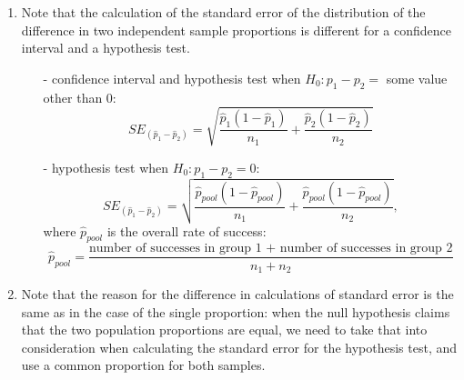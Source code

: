 \documentclass[11pt]{article}
\begin{document}
%
\begin{enumerate}[resume]
\renewcommand\labelenumi{\textcolor{light}{\textbf{LO \theenumi.}}}

\item Note that the calculation of the standard error of the distribution of the difference in two independent sample proportions is different for a confidence interval and a hypothesis test.
\begin{itemize}
\item[-] confidence interval and hypothesis test when $H_0: p_1 -p_2 =$ some value other than 0: 
\[SE_{(\hat{p}_1 - \hat{p}_2)} = \sqrt{\frac{ \hat{p}_1 (1 - \hat{p}_1)}{n_1} + \frac{ \hat{p}_2 (1 - \hat{p}_2)}{n_2} } \]
\item[-] hypothesis test when $H_0: p_1 -p_2 = 0$: 
\[SE_{(\hat{p}_1 - \hat{p}_2)} = \sqrt{\frac{ \hat{p}_{pool} (1 - \hat{p}_{pool})}{n_1} + \frac{ \hat{p}_{pool} (1 - \hat{p}_{pool})}{n_2} }, \]
where $\hat{p}_{pool}$ is the overall rate of success:
\[ \hat{p}_{pool} = \frac{\text{number of successes in group 1 + number of successes in group 2}}{n_1 + n_2} \]
\end{itemize}

\item Note that the reason for the difference in calculations of standard error is the same as in the case of the single proportion: when the null hypothesis claims that the two population proportions are equal, we need to take that into consideration when calculating the standard error for the hypothesis test, and use a common proportion for both samples.

\end{enumerate}
\end{document}

